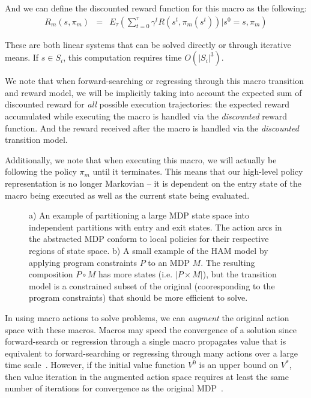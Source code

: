 And we can define the discounted reward function for this macro as the
following:
\begin{eqnarray*}
R_m(s,\pi_m) & = & E_{\tau} \left( \sum_{t=0}^{\tau} \gamma^t R(s^t, \pi_m(s^t)) | s^0 = s, \pi_m \right)
\end{eqnarray*}

These are both linear systems that can be solved directly or through iterative means.
If $s \in S_i$, this computation requires time $O(|S_i|^3)$.

We note that when forward-searching or regressing through this macro
transition and reward model, we will be implicitly taking into account
the expected sum of discounted reward for \emph{all} possible execution
trajectories: the expected reward accumulated while executing the
macro is handled via the
\emph{discounted} reward function.  And the reward received after the macro is handled via
the \emph{discounted} transition model.

Additionally, we note that when executing this macro, we will actually be
following the policy $\pi_m$ until it terminates.  This means that our high-level
policy representation is no longer Markovian -- it is dependent 
on the entry state of the macro being executed as well as the current state being
evaluated.

\begin{figure}[t!]

\begin{center}
\end{center}
\caption{a) An example of partitioning a large MDP state space into
independent partitions with entry and exit states.  The action arcs
in the abstracted MDP conform to local policies for their respective
regions of state space.  b) A small example of the HAM model by
applying program constraints $P$ to an MDP $M$.  The resulting composition
$P \circ M$ has more states (i.e. $|P \times M|$), but the transition model
is a constrained subset of the original (cooresponding to the program
constraints) that should be more efficient to solve.}
\label{factorham}

\end{figure}

In using macro actions to solve problems, we can \emph{augment} the original
action space with these macros.  Macros may speed the convergence of
a solution since forward-search or regression through a single macro propagates
value that is equivalent to forward-searching or regressing through many actions over
a large time scale~\cite{smdp}.
However, if the initial value function $V^0$
is an upper bound on $V^*$, then value iteration in the augmented action
space requires at least the same number of iterations for convergence
as the original MDP~\cite{HMKDB}.  

